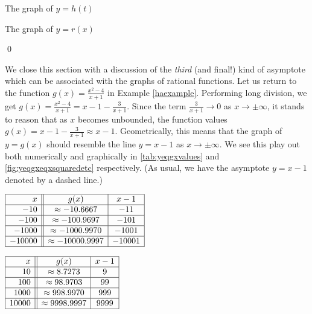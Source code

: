 \begin{ex}
\begin{enumerate}
\begin{mfigure}


\caption{The graph of $y=h(t)$}
\label{fig:yeqhteqsixtcubedetc}
\end{mfigure}

\begin{mfigure}
  

\caption{The graph of $y=r(x)$}
\label{fig:yeqrxeqtwominusetc}
\end{mfigure}

\end{enumerate}

\qed

\end{ex}

We close this section with a discussion of the \textit{third} (and final!) kind of asymptote which can be associated with the graphs of rational functions. Let us return to the function $g(x) = \frac{x^2-4}{x+1}$ in Example \ref{haexample}. Performing long division, we get $g(x) = \frac{x^2-4}{x+1} = x-1 - \frac{3}{x+1}$.  Since the term $\frac{3}{x+1} \rightarrow 0$ as $x \rightarrow \pm \infty$, it stands to reason that as $x$ becomes unbounded, the function values   $g(x) = x-1 - \frac{3}{x+1} \approx x-1$.  Geometrically, this means that the graph of $y=g(x)$ should resemble the line $y = x-1$ as $x \rightarrow \pm \infty$.  We see this play out both numerically and graphically in \autoref{tab:yeqgxvalues} and \autoref{fig:yeqgxeqxsquaredetc} respectively. (As usual, we have the asymptote $y = x-1$ denoted by a dashed line.)

\begin{itable}
  
$\begin{array}[t]{|r||c|c|}  \hline
  x & g(x) & x-1 \\ \hline
 -10 & \approx -10.6667 & -11 \\  \hline
 -100 & \approx -100.9697 & -101 \\  \hline 
 -1000 &  \approx -1000.9970&   -1001 \\ \hline 
  -10000 &  \approx -10000.9997 &  -10001 \\ \hline 
  \end{array} $

\medskip

$\begin{array}[t]{|r||c|c|}  \hline
  x & g(x) & x-1 \\ \hline
 10 & \approx 8.7273 &    9 \\\hline
 100 & \approx 98.9703 &   99 \\ \hline 
 1000 &  \approx 998.9970 &  999 \\ \hline 
  10000 &  \approx 9998.9997 &   9999 \\ \hline 
  \end{array} $

\caption{}
\label{tab:yeqgxvalues}
\end{itable}
  
